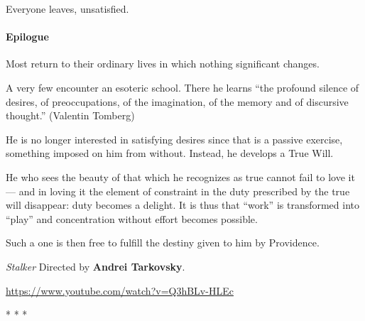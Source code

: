Everyone leaves, unsatisfied.

\paragraph{Epilogue}

Most return to their ordinary lives in which nothing significant changes.

A very few encounter an esoteric school. There he learns ``the profound silence of desires, of preoccupations, of the imagination, of the memory and of discursive thought.'' (Valentin Tomberg)

He is no longer interested in satisfying desires since that is a passive exercise, something imposed on him from without. Instead, he develops a True Will.

\begin{quotex}
He who sees the beauty of that which he recognizes as true cannot fail to love it --- and in loving it the element of constraint in the duty prescribed by the true will disappear: duty becomes a delight. It is thus that ``work'' is transformed into ``play'' and concentration without effort becomes possible.
\end{quotex}


Such a one is then free to fulfill the destiny given to him by Providence.

\textit{Stalker} Directed by \textbf{Andrei Tarkovsky}.

\url{https://www.youtube.com/watch?v=Q3hBLv-HLEc} 


\begin{center}* * *\end{center}

